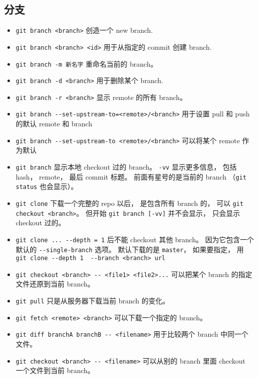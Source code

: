 \subsection{分支}
\begin{itemize}
\item \verb|git branch <branch>| 创造一个 new branch.
\item \verb|git branch <branch> <id>| 用于从指定的 commit 创建 branch.
\item \verb|git branch -m 新名字| 重命名当前的 branch。
\item \verb|git branch -d <branch>| 用于删除某个 branch.
\item \verb|git branch -r <branch>| 显示 remote 的所有 branch。
\item \verb|git branch --set-upstream-to=<remote>/<branch>| 用于设置 pull 和 push 的默认 remote 和 branch
\item \verb|git branch --set-upstream-to <remote>/<branch>| 可以将某个 remote 作为默认
\item \verb|git branch| 显示本地 checkout 过的 branch。 \verb|-vv| 显示更多信息， 包括 hash， remote， 最后 commit 标题。 前面有星号的是当前的 branch （\verb|git status| 也会显示）。
\item \verb|git clone| 下载一个完整的 repo 以后， 是包含所有 branch 的， 可以 \verb|git checkout <branch>|。 但开始 \verb|git branch [-vv]| 并不会显示， 只会显示 checkout 过的。
\item \verb|git clone ... --depth = 1| 后不能 checkout 其他 branch。 因为它包含一个默认的 \verb|--single-branch| 选项。 默认下载的是 \verb|master|， 如果要指定， 用 \verb|git clone --depth 1  --branch <branch> url|
\item \verb|git checkout <branch> -- <file1> <file2>...| 可以把某个 branch 的指定文件还原到当前 branch。
\item \verb|git pull| 只是从服务器下载当前 branch 的变化。
\item \verb|git fetch <remote> <branch>| 可以下载一个指定的 branch。
\item \verb|git diff branchA branchB -- <filename>| 用于比较两个 branch 中同一个文件。
\item \verb|git checkout <branch> -- <filename>| 可以从别的 branch 里面 checkout 一个文件到当前 branch。


\end{itemize}
